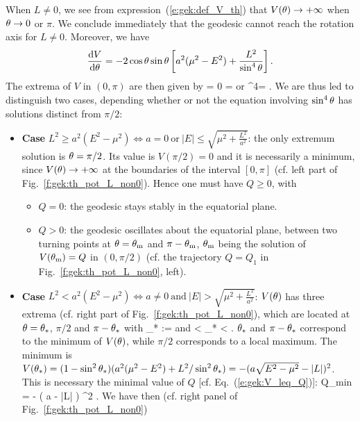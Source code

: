 When $L\not=0$, we see from expression~(\ref{e:gek:def_V_th}) that
$V(\theta) \to +\infty$ when $\theta\to 0$ or $\pi$.
We conclude immediately that the geodesic cannot reach the rotation axis
for $L\not=0$.
Moreover, we have
\[
    \frac{\mathrm{d} V}{\mathrm{d} \theta} = - 2 \cos\theta\sin\theta \left[ a^2 (\mu^2 - E^2) + \frac{L^2}{\sin^4\theta} \right] .
\]
The extrema of $V$ in $(0,\pi)$ are then given by
\be
     = 0 \iff
        \th =  \quad\mbox{or}\quad
        \sin^4\th =  .
\ee
We are thus led to distinguish two cases, depending whether or not the
equation involving $\sin^4\theta$ has solutions distinct from $\pi/2$:
\begin{itemize}
\item \textbf{Case} $L^2 \geq a^2(E^2 - \mu^2) \iff a=0\
\mbox{or}\ |E| \leq \sqrt{\mu^2 + \frac{L^2}{a^2}}$: the only extremum solution is
$\theta=\pi/2$.
Its value is $V(\pi/2)=0$ and it is
necessarily a minimum, since $V(\theta) \to +\infty$ at the boundaries of the
interval $[0,\pi]$ (cf. left part of Fig.~\ref{f:gek:th_pot_L_non0}).
Hence one must have $Q\geq 0$, with
\begin{itemize}
\item $Q=0$: the geodesic stays stably in the
equatorial plane.
\item $Q>0$: the geodesic oscillates about the equatorial plane,
between two turning points at $\theta=\theta_{\rm m}$ and $\pi-\theta_{\rm m}$, $\theta_{\rm m}$ being the solution
of $V(\theta_{\rm m}) = Q$ in $(0,\pi/2)$ (cf. the trajectory $Q=Q_1$ in Fig.~\ref{f:gek:th_pot_L_non0}, left).
\end{itemize}
\item \textbf{Case} $L^2 < a^2(E^2 - \mu^2)  \iff a\neq 0\
\mbox{and}\ |E| > \sqrt{\mu^2 + \frac{L^2}{a^2}}$: $V(\theta)$ has three extrema (cf. right part of Fig.~\ref{f:gek:th_pot_L_non0}), which are located at
$\theta=\theta_*$, $\pi/2$ and $\pi-\theta_*$ with
\be \label{e:gek:theta_star}
    \th_* := \arcsin{}
    \quad\mbox{and}\quad 0 < \th_* <  .
\ee
$\theta_*$ and $\pi-\theta_*$ correspond to the minimum of $V(\theta)$,
while $\pi/2$ corresponds to a local maximum. The minimum is
$V(\th_*) = (1-\sin^2\th_*)(a^2(\mu^2-E^2) + L^2/\sin^2\th_*) = - (a  - |L|)^2$.
This is necessary the minimal value of $Q$ [cf. Eq.~(\ref{e:gek:V_leq_Q})]:
\be  \label{e:gek:Q_min_prov}
    Q_{\rm min} = - \left( a \sqrt{E^2 - \mu^2} - |L| \right) ^2 .
\ee
We have then (cf. right panel of Fig.~\ref{f:gek:th_pot_L_non0})
\begin{itemize}

\end{itemize}
\end{itemize}
